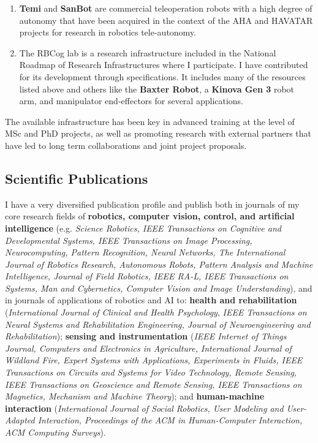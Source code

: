 \begin{enumerate}
  \textbf{PEPE} is an augmented reality platform for physical and
  cognitive stimulation composed of a mobile base, an ultra-wide throw
  projector, a computer and a motion sensor that was developed in the
  AHA project. It has spawned other projects and has raised interest for
  commercial exploitation. A national patent has been granted in 2024,
  and international patents submitted.
\item
  \textbf{Temi} and \textbf{SanBot} are commercial teleoperation robots
  with a high degree of autonomy that have been acquired in the context
  of the AHA and HAVATAR projects for research in robotics
  tele-autonomy.
\item
  The RBCog lab is a research infrastructure included in the National
  Roadmap of Research Infrastructures where I participate. I have
  contributed for its development through specifications. It includes
  many of the resources listed above and others like the \textbf{Baxter
  Robot}, a \textbf{Kinova Gen 3} robot arm, and manipulator
  end-effectors for several applications.
\end{enumerate}

The available infrastructure has been key in advanced training at the
level of MSc and PhD projects, as well as promoting research with
external partners that have led to long term collaborations and joint
project proposals.

\subsection{Scientific Publications}\label{scientific-publications}

I have a very diversified publication profile and publish both in
journals of my core research fields of \textbf{robotics, computer
vision, control, and artificial intelligence} (e.g. \emph{Science
Robotics, IEEE Transactions on Cognitive and Developmental Systems, IEEE
Transactions on Image Processing,} \emph{Neurocomputing, Pattern
Recognition, Neural Networks, The International Journal of Robotics
Research, Autonomous Robots, Pattern Analysis and Machine Intelligence,
Journal of Field Robotics, IEEE RA-L, IEEE Transactions on Systems, Man
and Cybernetics, Computer Vision and Image Understanding}), and in
journals of applications of robotics and AI to: \textbf{health and
rehabilitation} (\emph{International Journal of Clinical and Health
Psychology}, \emph{IEEE Transactions on Neural Systems and
Rehabilitation Engineering, Journal of Neuroengineering and
Rehabilitation}); \textbf{sensing and instrumentation} (\emph{IEEE
Internet of Things Journal, Computers and Electronics in Agriculture,
International Journal of Wildland Fire, Expert Systems with
Applications, Experiments in Fluids, IEEE Transactions on Circuits and
Systems for Video Technology, Remote Sensing, IEEE Transactions on
Geoscience and Remote Sensing, IEEE Transactions on Magnetics, Mechanism
and Machine Theory}); and \textbf{human-machine interaction}
(\emph{International Journal of Social Robotics, User Modeling and
User-Adapted Interaction, Proceedings of the ACM in Human-Computer
Interaction, ACM Computing Surveys}).

